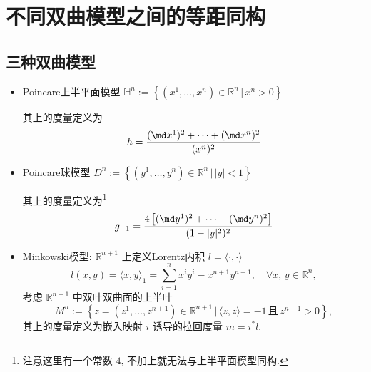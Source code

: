 \section{不同双曲模型之间的等距同构}
\subsection{三种双曲模型}
    \begin{itemize}
        \item Poincare上半平面模型 $\mathbb{H}^n:=\left\{\left(x^1,\dots,x^n\right)\in\mathbb{R}^n\,\Big|\,x^n>0\right\}$  
        
        其上的度量定义为
        \begin{equation*}
            h=\frac{(\md x^1)^2+\cdots+(\md x^n)^2}{(x^n)^2}
        \end{equation*}

        \item Poincare球模型 $D^n:=\left\{\left(y^1,\dots,y^n\right)\in\mathbb{R}^n\,\Big|\,|y|<1\right\}$
        
        其上的度量定义为\footnote{注意这里有一个常数 $4$, 不加上就无法与上半平面模型同构.}
        \begin{equation*}
            g_{-1}=\frac{4\left[(\md y^1)^2+\cdots+(\md y^n)^2\right]}{(1-|y|^2)^2}
        \end{equation*}

        \item Minkowski模型: $\mathbb{R}^{n+1}$ 上定义Lorentz内积 $l=\langle\cdot,\cdot\rangle$
        \begin{equation*}
            l(x,y)=\langle x,y\rangle_1=\sum_{i=1}^{n}x^iy^i-x^{n+1}y^{n+1},\quad\forall x,\,y\in\mathbb{R}^n,
        \end{equation*}
        考虑 $\mathbb{R}^{n+1}$ 中双叶双曲面的上半叶
        \begin{equation*}
            M^n:=\left\{z=\left(z^1,\dots,z^{n+1}\right)\in\mathbb{R}^{n+1}\,\Big|\,\langle z,z\rangle=-1\,\text{且}\,z^{n+1}>0\right\},
        \end{equation*}
        其上的度量定义为嵌入映射 $i$ 诱导的拉回度量 $m=i^*l$.
    \end{itemize}
